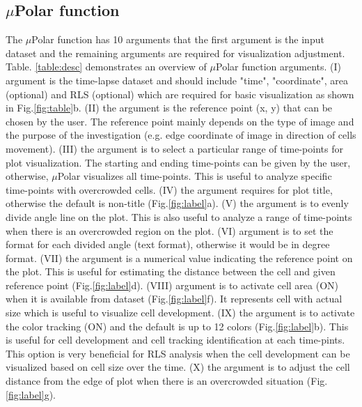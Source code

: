 \documentclass[conference]{IEEEtran}
\begin{document}
\subsection{$\mu$Polar function}

The $\mu$Polar function has 10 arguments that the first argument is the input dataset and the remaining arguments are required for visualization adjustment. Table. \ref{table:desc} demonstrates an overview of $\mu$Polar function arguments. (I) argument is the time-lapse dataset and should  include "time", "coordinate", area (optional) and RLS (optional) which are required for basic visualization as shown in Fig.\ref{fig:table}b. (II) the argument is the reference point (x, y) that can be chosen by the user. The reference point mainly depends on the type of image and the purpose of the investigation (e.g. edge coordinate of image in direction of cells movement). (III) the argument is to select a particular range of time-points for plot visualization. The starting and ending time-points can be given by the user, otherwise, $\mu$Polar visualizes all time-points. This is useful to analyze specific time-points with overcrowded cells. (IV) the argument requires for plot title, otherwise the default is non-title (Fig.\ref{fig:label}a). (V) the argument is to evenly divide angle line on the plot. This is also useful to analyze a range of time-points when there is an overcrowded region on the plot. (VI) argument is to set the format for each divided angle (text format), otherwise it would be in degree format. (VII) the argument is a numerical value indicating the reference point on the plot. This is useful for estimating the distance between the cell and given reference point (Fig.\ref{fig:label}d). (VIII) argument is to activate cell area (ON) when it is available from dataset (Fig.\ref{fig:label}f). It represents cell with actual size which is useful to visualize cell development. (IX) the argument is to activate the color tracking (ON) and the default is up to 12 colors (Fig.\ref{fig:label}b). This is useful for cell development and cell tracking identification at each time-pints. This option is very beneficial for RLS analysis when the cell development can be visualized based on cell size over the time. (X) the argument is to adjust the cell distance from the edge of plot when there is an overcrowded situation (Fig.\ref{fig:label}g). 
\end{document}
